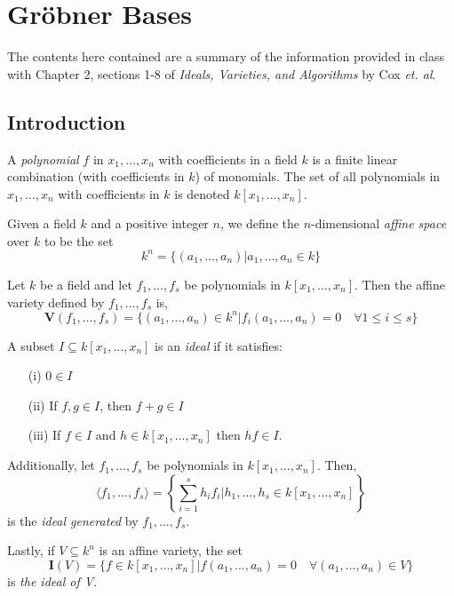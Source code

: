 \section{Gr\"obner Bases}

The contents here contained are a summary of the information provided in class with Chapter 2, sections 1-8 of \textit{Ideals, Varieties, and Algorithms} by Cox \textit{et. al}.

\subsection{Introduction}

\begin{definition}[Polynomial]
    A \textit{polynomial} $f$ in $x_1, \dots, x_n$ with coefficients in a field $k$ is a finite linear combination (with coefficients in $k$) of monomials.
    The set of all polynomials in $x_1, \dots, x_n$ with coefficients in $k$ is denoted $k[x_1, \dots, x_n]$.
\end{definition}

\begin{definition}
    Given a field $k$ and a positive integer $n$, we define the $n$-dimensional \textit{affine space} over $k$ to be the set
    $$k^n = \{ (a_1, \dots, a_n) | a_1, \dots, a_n \in k \}$$
\end{definition}

\begin{definition}
    Let $k$ be a field and let $f_1, \dots, f_s$ be polynomials in $k[x_1, \dots, x_n]$.
    Then the affine variety defined by $f_1, \dots, f_s$ is,
    $$\pmb{V}(f_1, \dots, f_s) = \{ (a_1, \dots, a_n) \in k^n | f_i(a_1, \dots, a_n) = 0 \quad \forall 1 \leq i \leq s \}$$
\end{definition}

\begin{definition}[Ideals]
    A subset $I \subseteq k[x_1, \dots, x_n]$ is an \textit{ideal} if it satisfies:
    \begin{enumerate}
        \item[(i)] $0 \in I$
        \item[(ii)] If $f, g \in I$, then $f + g \in I$
        \item[(iii)] If $f \in I$ and $h \in k[x_1, \dots, x_n]$ then $hf \in I$.
    \end{enumerate}
    Additionally, let $f_1, \dots, f_s$ be polynomials in $k[x_1, \dots, x_n]$.
    Then,
    $$\langle f_1, \dots, f_s\rangle = \left\{ \sum_{i=1}^s h_i f_i | h_1, \dots, h_s \in k[x_1, \dots, x_n] \right\}$$
    is the \textit{ideal generated} by $f_1, \dots, f_s$.

    Lastly, if $V \subseteq k^n$ is an affine variety, the set
    $$\pmb{I}(V) = \{f \in k[x_1, \dots, x_n] | f(a_1, \dots, a_n) = 0 \quad \forall (a_1, \dots, a_n) \in V\}$$
    is \textit{the ideal of V}.
\end{definition}

